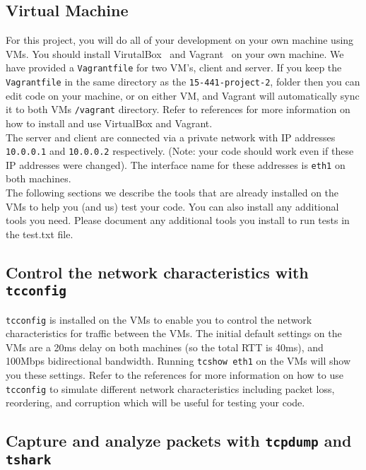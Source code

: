 
\subsection{Virtual Machine}
For this project, you will do all of your development on your own machine using VMs. You should install VirutalBox~\cite{virtualbox} and Vagrant~\cite{vagrant} on your own machine.
We have provided a \texttt{Vagrantfile} for two VM's, client and server. If you keep the \texttt{Vagrantfile} in the same directory as the \texttt{15-441-project-2}, folder then you can edit code on your machine, or on either VM, and Vagrant will automatically sync it to both VMs \texttt{/vagrant} directory. Refer to references for more information on how to install and use VirtualBox and Vagrant.\\

The server and client are connected via a private network with IP addresses \texttt{10.0.0.1} and \texttt{10.0.0.2} respectively. (Note: your code should work even if these IP addresses were changed). The interface name for these addresses is \texttt{eth1} on both machines. \\

The following sections we describe the tools that are already installed on the VMs to help you (and us) test your code. You can also install any additional tools you need. Please document any additional tools you install to run tests in the test.txt file.

\subsection{Control the network characteristics with \texttt{tcconfig}}
\texttt{tcconfig} \cite{tc} is installed on the VMs to enable you to control the network characteristics for traffic between the VMs. The initial default settings on the VMs are a 20ms delay on both machines (so the total RTT is 40ms), and 100Mbps bidirectional bandwidth. Running \texttt{tcshow eth1} on the VMs will show you these settings. Refer to the references for more information on how to use \texttt{tcconfig} to simulate different network characteristics including packet loss, reordering, and corruption which will be useful for testing your code.

\subsection{Capture and analyze packets with \texttt{tcpdump} and \texttt{tshark}}

